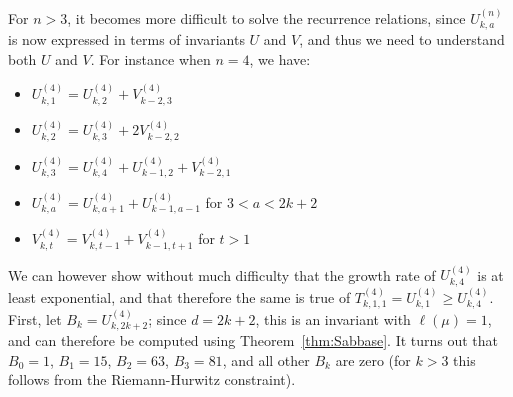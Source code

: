 \documentclass[thesis]{thesis-umich}           %
\theoremstyle{definition}
\newtheorem{prop}[thm]{Proposition}
\begin{document}
For $n>3$, it becomes more difficult to solve the recurrence relations,
since $U_{k,a}^{(n)}$ is now expressed in terms of invariants $U$ and $V$,
and thus we need to understand both $U$ and $V$.
For instance when $n=4$, we have:
\begin{itemize}
\item $U_{k,1}^{(4)}=U_{k,2}^{(4)}+V_{k-2,3}^{(4)}$
\item $U_{k,2}^{(4)}=U_{k,3}^{(4)}+2V_{k-2,2}^{(4)}$
  \item $U_{k,3}^{(4)}=U_{k,4}^{(4)}+U_{k-1,2}^{(4)}+V_{k-2,1}^{(4)}$
\item $U_{k,a}^{(4)}=U_{k,a+1}^{(4)}+U_{k-1,a-1}^{(4)}$ for $3<a<2k+2$
  \item $V_{k,t}^{(4)}=V_{k,t-1}^{(4)}+V_{k-1,t+1}^{(4)}$ for $t>1$
\end{itemize}
\iffalse
The last equation yields the following result:
\begin{prop}
  For $k\geq 0$ and $t>1$,
  \[
  V_{k,t}^{(4)}=a_0(t)V_{k,1}^{(4)}+a_1(t)V_{k-1,1}^{(4)}+a_2(t)V_{k-2,1}^{(4)}+\dots+a_{k-1}(t)V_{1,1}^{(4)}+a_k(t)V_{0,1}^{(4)}=\sum_{n=0}^k a_n(t)V_{k-n,1}^{(4)}
  \]
  where
  \[
  a_k(t)=\#\{(r_1,\dots,r_k):r_k\leq t+1,\ 3\leq r_i\leq r_{i+1}+1\text{ for }1\leq i<k\}
  \]
\end{prop}
\begin{proof}
  TODO
\end{proof}
\fi
We can however show without much difficulty that the
growth rate of $U_{k,4}^{(4)}$ is at least
exponential, and that therefore the same
is true of $T_{k,1,1}^{(4)}=U_{k,1}^{(4)}\geq U_{k,4}^{(4)}$.
First, let $B_k=U_{k,2k+2}^{(4)}$; since
$d=2k+2$, this is an invariant with $\ell(\mu)=1$,
and can therefore be computed using Theorem~\ref{thm:Sabbase}. It
turns out that $B_0=1$, $B_1=15$, $B_2=63$, $B_3=81$,
and all other $B_k$ are zero (for $k>3$ this
follows from the Riemann-Hurwitz constraint).
\end{document}
